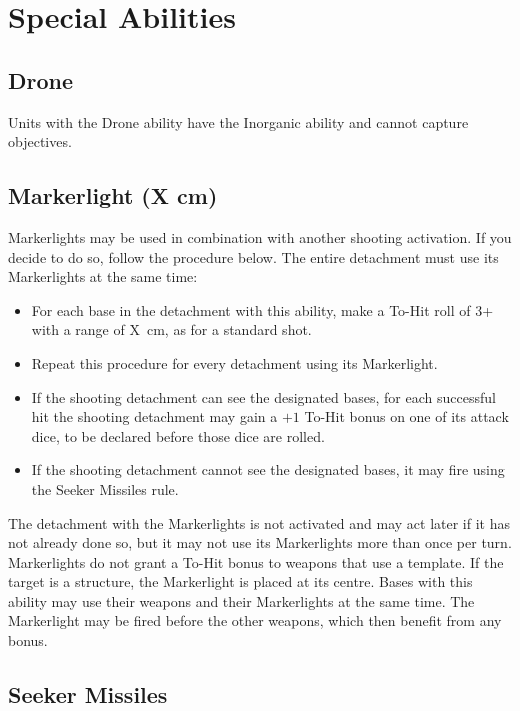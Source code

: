 \section{Special Abilities}

\subsection{Drone}

Units with the Drone ability have the Inorganic ability and cannot capture objectives.

\subsection{Markerlight (X cm)}

Markerlights may be used in combination with another shooting activation. If you decide to do so, follow the procedure below. The entire detachment must use its Markerlights at the same time:

\begin{itemize}
    \item For each base in the detachment with this ability, make a To-Hit roll of 3+ with a range of X~cm, as for a standard shot.
    \item Repeat this procedure for every detachment using its Markerlight.
    \item If the shooting detachment can see the designated bases, for each successful hit the shooting detachment may gain a $+1$ To-Hit bonus on one of its attack dice, to be declared before those dice are rolled.
    \item If the shooting detachment cannot see the designated bases, it may fire using the Seeker Missiles rule.
\end{itemize}

The detachment with the Markerlights is not activated and may act later if it has not already done so, but it may not use its Markerlights more than once per turn. Markerlights do not grant a To-Hit bonus to weapons that use a template. If the target is a structure, the Markerlight is placed at its centre. Bases with this ability may use their weapons and their Markerlights at the same time. The Markerlight may be fired before the other weapons, which then benefit from any bonus.

\subsection{Seeker Missiles}

